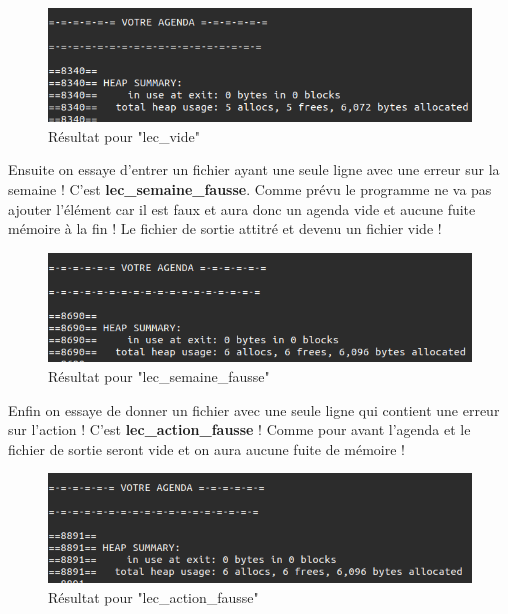 \documentclass[12pt,french]{article} %
\begin{document}
\begin{figure}[H]
	\includegraphics[scale=0.6]{s-vide.png}
	\centering
	\caption{Résultat pour "lec\_vide"}
\end{figure}

Ensuite on essaye d'entrer un fichier ayant une seule ligne avec une erreur sur la semaine ! C'est \textbf{lec\_semaine\_fausse}. Comme prévu le programme ne va pas ajouter l'élément car il est faux et aura donc un agenda vide et aucune fuite mémoire à la fin ! Le fichier de sortie attitré et devenu un fichier vide !\newline

\begin{figure}[H]
	\includegraphics[scale=0.6]{s-fausse.png}
	\centering
	\caption{Résultat pour "lec\_semaine\_fausse"}
\end{figure}

Enfin on essaye de donner un fichier avec une seule ligne qui contient une erreur sur l'action ! C'est \textbf{lec\_action\_fausse} ! Comme pour avant l'agenda et le fichier de sortie seront vide et on aura aucune fuite de mémoire !\newline

\begin{figure}[H]
	\includegraphics[scale=0.6]{a-fausse.png}
	\centering
	\caption{Résultat pour "lec\_action\_fausse"}
\end{figure}
\end{document}

